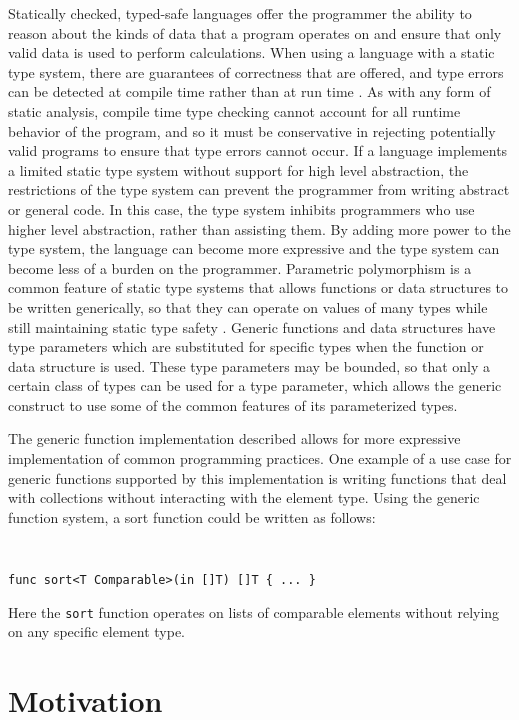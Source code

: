 \documentclass[letterpaper,11pt]{article}
\begin{document}
Statically checked, typed-safe languages offer the programmer the ability to reason about the kinds of data that a program operates on and ensure that only valid data is used to perform calculations. When using a language with a static type system, there are guarantees of correctness that are offered, and type errors can be detected at compile time rather than at run time \cite{milner1978theory}. As with any form of static analysis, compile time type checking cannot account for all runtime behavior of the program, and so it must be conservative in rejecting potentially valid programs to ensure that type errors cannot occur. If a language implements a limited static type system without support for high level abstraction, the restrictions of the type system can prevent the programmer from writing abstract or general code. In this case, the type system inhibits programmers who use higher level abstraction, rather than assisting them. By adding more power to the type system, the language can become more expressive and the type system can become less of a burden on the programmer. Parametric polymorphism is a common feature of static type systems that allows functions or data structures to be written generically, so that they can operate on values of many types while still maintaining static type safety \cite{cardelli1987basic}. Generic functions and data structures have type parameters which are substituted for specific types when the function or data structure is used. These type parameters may be bounded, so that only a certain class of types can be used for a type parameter, which allows the generic construct to use some of the common features of its parameterized types.

The generic function implementation described allows for more expressive implementation of common programming practices. One example of a use case for generic functions supported by this implementation is writing functions that deal with collections without interacting with the element type. Using the generic function system, a sort function could be written as follows:

{ \tt \small
\begin{verbatim}
func sort<T Comparable>(in []T) []T { ... }
\end{verbatim}
}
Here the \texttt{sort} function operates on lists of comparable elements without relying on any specific element type.

\section{Motivation} \label{motivation}
\end{document}
